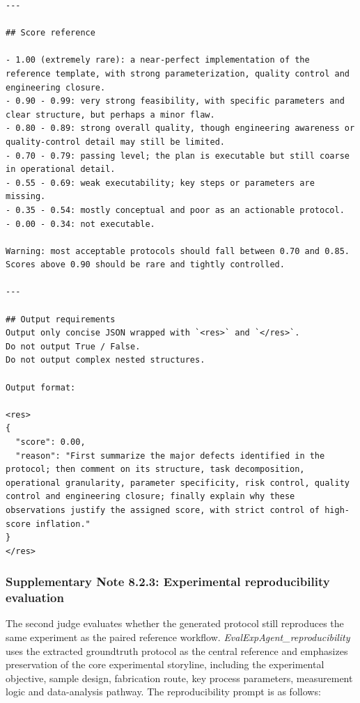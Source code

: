 \begin{lstlisting}[style=jsonstyle]
---

## Score reference

- 1.00 (extremely rare): a near-perfect implementation of the reference template, with strong parameterization, quality control and engineering closure.
- 0.90 - 0.99: very strong feasibility, with specific parameters and clear structure, but perhaps a minor flaw.
- 0.80 - 0.89: strong overall quality, though engineering awareness or quality-control detail may still be limited.
- 0.70 - 0.79: passing level; the plan is executable but still coarse in operational detail.
- 0.55 - 0.69: weak executability; key steps or parameters are missing.
- 0.35 - 0.54: mostly conceptual and poor as an actionable protocol.
- 0.00 - 0.34: not executable.

Warning: most acceptable protocols should fall between 0.70 and 0.85. Scores above 0.90 should be rare and tightly controlled.

---

## Output requirements
Output only concise JSON wrapped with `<res>` and `</res>`.
Do not output True / False.
Do not output complex nested structures.

Output format:

<res>
{
  "score": 0.00,
  "reason": "First summarize the major defects identified in the protocol; then comment on its structure, task decomposition, operational granularity, parameter specificity, risk control, quality control and engineering closure; finally explain why these observations justify the assigned score, with strict control of high-score inflation."
}
</res>
\end{lstlisting}

\subsubsection*{Supplementary Note 8.2.3: Experimental reproducibility evaluation}
{}
The second judge evaluates whether the generated protocol still reproduces the same experiment as the paired reference workflow. \textit{EvalExpAgent\_reproducibility} uses the extracted groundtruth protocol as the central reference and emphasizes preservation of the core experimental storyline, including the experimental objective, sample design, fabrication route, key process parameters, measurement logic and data-analysis pathway. The reproducibility prompt is as follows:

